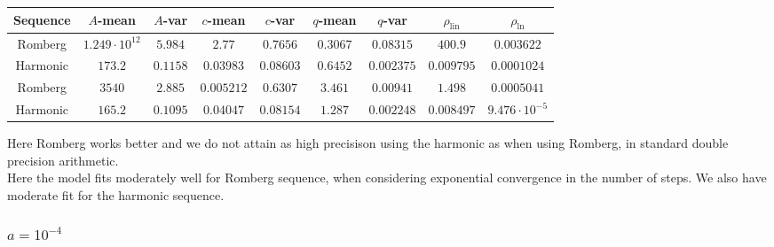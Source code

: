 \begin{table}[H]
    \centering
    \small
    \begin{tabular}{c||c|c|c|c|c|c|c|c}
Sequence & \(A\)-mean & \(A\)-var & \(c\)-mean & \(c\)-var & \(q\)-mean & \(q\)-var & \(\rho_{\operatorname{lin}}\) & \(\rho_{\ln}\)\\\hline
\rowcolor{red}
Romberg & \(1.249\cdot 10^{12}\) & \(5.984\) & \(2.77\) & \(0.7656\) & \(0.3067\) & \(0.08315\) & \(400.9\) & \(0.003622\) \\
\rowcolor{green}
Harmonic & \(173.2\) & \(0.1158\) & \(0.03983\) & \(0.08603\) & \(0.6452\) & \(0.002375\) & \(0.009795\) & \(0.0001024\) \\
\rowcolor{green}
Romberg & \(3540\) & \(2.885\) & \(0.005212\) & \(0.6307\) & \(3.461\) & \(0.00941\) & \(1.498\) & \(0.0005041\) \\
\rowcolor{green}
Harmonic & \(165.2\) & \(0.1095\) & \(0.04047\) & \(0.08154\) & \(1.287\) & \(0.002248\) & \(0.008497\) & \(9.476\cdot 10^{-5}\) \\
    \end{tabular}
    \label{tab:my_label}
\end{table}

Here Romberg works better and we do not attain as high precisison using the harmonic as when using Romberg, in standard double precision arithmetic.\\

Here the model fits moderately well for Romberg sequence, when considering exponential convergence in the number of steps. We also have moderate fit for the harmonic sequence.

\subsubsection{\(a = 10^{-4}\)}

